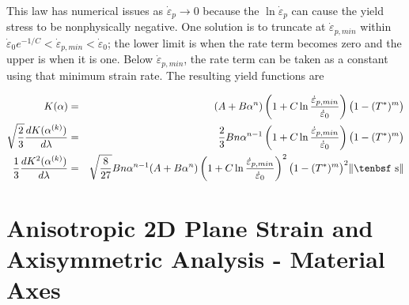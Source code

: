 \documentclass[11pt]{book}
\def\dev{\hbox{\tenbsf s}}
\begin{document}
\noindent This law has numerical issues as $\dot{\varepsilon}_p\to 0$ because the $\ln \dot{\varepsilon}_p$ can cause the yield stress to be nonphysically negative. One solution is to truncate at $\dot{\varepsilon}_{p,min}$ within $\dot{\varepsilon}_0 e^{-1/C} < \dot{\varepsilon}_{p,min} < \dot{\varepsilon}_0$; the lower limit is when the rate term becomes zero and the upper is when it is one. Below $\dot{\varepsilon}_{p,min}$, the rate term can be taken as a constant using that minimum strain rate. The resulting yield functions are

\begin{eqnarray}
   K(\alpha) & = &  (A+B\alpha^n)\left(1+C\ln{\dot{\varepsilon}_{p,min}\over \dot{\varepsilon}_0}\right)\bigl(1-(T^*)^m\bigr) \\
   \sqrt{2\over3}{dK(\alpha^{(k)})\over d\lambda} & = &  {2\over 3} B n \alpha^{n-1}\left(1+C\ln{\dot{\varepsilon}_{p,min}\over \dot{\varepsilon}_0}\right)
                   \bigl(1-(T^*)^m\bigr)\\
   {1\over3}{dK^2(\alpha^{(k)})\over d\lambda} & = & \sqrt{8\over27}B n \alpha^{n-1}(A+B\alpha^n)\left(1+C\ln{\dot{\varepsilon}_{p,min}\over \dot{\varepsilon}_0}\right)^2
                   \bigl(1-(T^*)^m\bigr)^2   \|\dev\|
\end{eqnarray}

\section{Anisotropic 2D Plane Strain and Axisymmetric Analysis - Material Axes}
\end{document}
